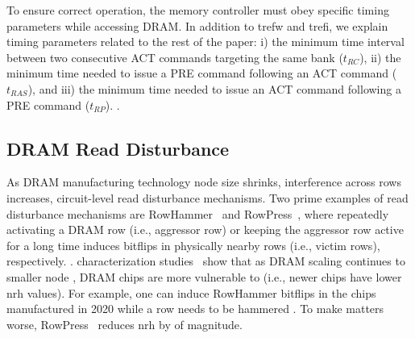 To ensure correct operation, the memory controller must obey specific timing parameters while accessing DRAM.
In addition to \gls{trefw} and \gls{trefi}, we explain  timing parameters related to the rest of the paper:
i) the minimum time interval between two consecutive ACT commands targeting the same bank ($t_{RC}$),
ii) the minimum time needed to issue a PRE command following an ACT command ($t_{RAS}$), and
iii) the minimum time needed to issue an ACT command following a PRE command ($t_{RP}$).
.

\subsection{DRAM Read Disturbance}
As DRAM manufacturing technology node size shrinks, interference across rows increases,  circuit-level read disturbance mechanisms.
Two prime examples of read disturbance mechanisms are RowHammer~\cite{kim2014flipping} and RowPress~\cite{luo2023rowpress}, where repeatedly activating  a DRAM row (i.e., aggressor row) or keeping the aggressor row active for a long time  induces bitflips in physically nearby rows (i.e., victim rows), respectively.
.
 characterization studies~\understandingRowHammerAllCitations{} show that as DRAM  scaling continues to smaller  node , DRAM chips are  more vulnerable to  (i.e., newer chips have lower \gls{nrh} values).
For example, one can induce RowHammer bitflips  in the chips manufactured in 2020 while a row needs to be hammered .
To make matters worse, RowPress~\cite{luo2023rowpress} reduces \gls{nrh} by  of magnitude. 

